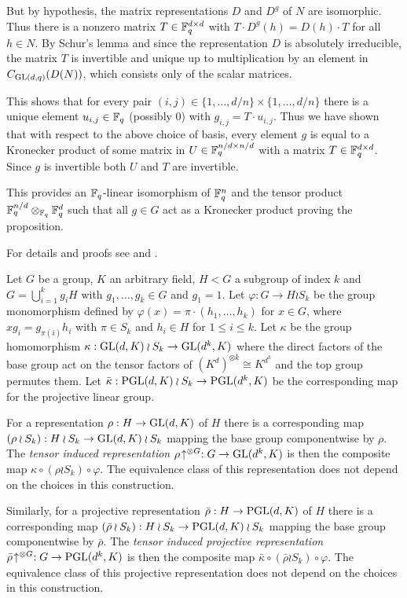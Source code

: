 But by hypothesis, the matrix representations $D$ and $D^g$ of $N$
are isomorphic. Thus there is a nonzero matrix $T \in \mathbb{F}_q^{d \times d}$ with
$T \cdot D^g(h) = D(h) \cdot T$ for all $h \in N$. By Schur's lemma and
since the representation $D$ is absolutely irreducible,
the matrix $T$ is invertible and unique 
up to multiplication by an element in $C_{\GL(d,q)}(D(N))$, which
consists only of the scalar matrices.

This shows that for every pair $(i,j) \in \{ 1, \ldots, d/n \} \times 
\{ 1, \ldots, d/n \}$ there
is a unique element $u_{i,j} \in \mathbb{F}_q$ (possibly $0$) with 
$g_{i,j} = T \cdot u_{i,j}$. Thus we have shown that with respect to
the above choice of basis, every element $g$ is equal to a Kronecker 
product of some matrix in $U \in \mathbb{F}_q^{n/d \times n/d}$ with a matrix
$T \in \mathbb{F}_q^{d \times d}$. Since $g$ is invertible both 
$U$ and $T$ are invertible. 

This provides an $\mathbb{F}_q$-linear isomorphism of 
$\mathbb{F}_q^n$ and the tensor product $\mathbb{F}_q^{n/d} \otimes_{\mathbb{F}_q} \mathbb{F}_q^d$
such that all $g \in G$ act as a Kronecker product proving the
proposition.
\proofend

\begin{DefProp}
%
    For details and proofs see \cite[13A]{CRI} and \cite[Section~2]{kovacs}.

    Let $G$ be a group, $K$ an arbitrary field, $H<G$ a subgroup of
    index $k$ and $G=\bigcup_{i=1}^k g_i H$ with $g_1,\ldots,g_k \in
    G$ and $g_1=1$. Let $\varphi : G \to H \wr S_k$ be the group
    monomorphism defined by $\varphi(x) = \pi \cdot (h_1,\ldots,h_k)$
    for $x \in G$, where $xg_i = g_{\pi(i)}h_i$ with $\pi \in S_k$
    and $h_i \in H$ for $1 \le i \le k$.
    Let $\kappa$ be the group homomorphism $\kappa: \GL(d,K)
    \wr S_k \to \GL(d^k,K)$ where the direct factors of the base group
    act on the tensor factors of $(K^d)^{\otimes k} \cong K^{d^k}$ and
    the top group permutes them. Let $\bar\kappa : \PGL(d,K) \wr S_k
    \to \PGL(d^k,K)$ be the corresponding map for the projective linear
    group.

    For a representation $\rho: H \to \GL(d,K)$ of $H$
    there is a corresponding map $(\rho \wr S_k) : H \wr S_k \to
    \GL(d,K) \wr S_k$ mapping the base group componentwise by $\rho$. 
    The \emph{tensor induced representation}
    $\rho\!\uparrow^{\otimes G} : G \to \GL(d^k,K)$ is then the
    composite map $\kappa \circ (\rho \wr S_k) \circ \varphi$. The
    equivalence class of this representation does not depend on the
    choices in this construction.

    Similarly,
    for a projective representation $\bar\rho : H \to \PGL(d,K)$ of
    $H$ there is a corresponding map 
    $(\bar\rho \wr S_k) : H \wr S_k \to \PGL(d,K) \wr S_k$ 
    mapping the base group
    componentwise by $\bar\rho$.
    The \emph{tensor induced projective representation}
    $\bar\rho\!\uparrow^{\otimes G} : G \to \PGL(d^k,K)$ is then the
    composite map $\bar\kappa \circ (\bar\rho \wr S_k) \circ \varphi$.
    The equivalence class of this projective representation does not
    depend on the choices in this construction.
\end{DefProp}

